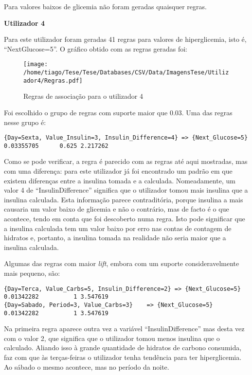 Para valores baixos de glicemia não foram geradas quaisquer regras.


\textbf{Utilizador 4}

Para este utilizador foram geradas 41 regras para valores de hiperglicemia, isto é, ``Next\textunderscore Glucose=5''. O gráfico obtido com as regras geradas foi:

\begin{figure}[H]
\centering
\texttt{[image: /home/tiago/Tese/Tese/Databases/CSV/Data/ImagensTese/Utilizador4/Regras.pdf]}
\caption{Regras de associação para o utilizador 4}
\end{figure}
Foi escolhido o grupo de regras com suporte maior que 0.03. Uma das regras nesse grupo é:
 
\begin{lstlisting}
{Day=Sexta, Value_Insulin=3, Insulin_Difference=4} => {Next_Glucose=5} 0.03355705      0.625 2.217262
\end{lstlisting}
Como se pode verificar, a regra é parecido com as regras até aqui mostradas, mas com uma diferença: para este utilizador já foi encontrado um padrão em que existem diferenças entre a insulina tomada e a calculada. Nomeadamente, um valor 4 de ``Insulin\textunderscore Difference'' significa que o utilizador tomou mais insulina que a insulina calculada. Esta informação parece contraditória, porque insulina a mais causaria um valor baixo de glicemia e não o contrário, mas de facto é o que acontece, tendo em conta que foi descoberto numa regra. Isto pode significar que a insulina calculada tem um valor baixo por erro nas contas de contagem de hidratos e, portanto, a insulina tomada na realidade não seria maior que a insulina calculada.

Algumas das regras com maior \textit{lift}, embora com um suporte consideravelmente mais pequeno, são:

\begin{lstlisting}
{Day=Terca, Value_Carbs=5, Insulin_Difference=2} => {Next_Glucose=5} 0.01342282          1 3.547619
{Day=Sabado, Period=3, Value_Carbs=3}    => {Next_Glucose=5} 0.01342282          1 3.547619
\end{lstlisting}
Na primeira regra aparece outra vez a variável ``Insulin\textunderscore Difference'' mas desta vez com o valor 2, que significa que o utilizador tomou menos insulina que o calculado. Aliando isso à grande quantidade de hidratos de carbono consumida, faz com que às terças-feiras o utilizador tenha tendência para ter hiperglicemia. Ao sábado o mesmo acontece, mas no período da noite.


